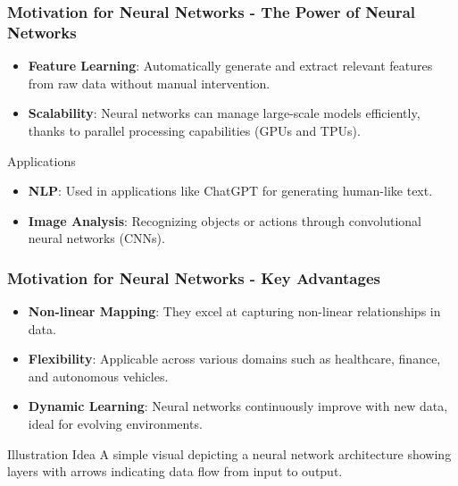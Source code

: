 \documentclass[aspectratio=169]{beamer}
\begin{document}
\begin{frame}[fragile]
    \frametitle{Motivation for Neural Networks - The Power of Neural Networks}
    \begin{itemize}
        \item \textbf{Feature Learning}: Automatically generate and extract relevant features from raw data without manual intervention.
        \item \textbf{Scalability}: Neural networks can manage large-scale models efficiently, thanks to parallel processing capabilities (GPUs and TPUs).
    \end{itemize}
    \begin{block}{Applications}
        \begin{itemize}
            \item \textbf{NLP}: Used in applications like ChatGPT for generating human-like text.
            \item \textbf{Image Analysis}: Recognizing objects or actions through convolutional neural networks (CNNs).
        \end{itemize}
    \end{block}
\end{frame}

\begin{frame}[fragile]
    \frametitle{Motivation for Neural Networks - Key Advantages}
    \begin{itemize}
        \item \textbf{Non-linear Mapping}: They excel at capturing non-linear relationships in data.
        \item \textbf{Flexibility}: Applicable across various domains such as healthcare, finance, and autonomous vehicles.
        \item \textbf{Dynamic Learning}: Neural networks continuously improve with new data, ideal for evolving environments.
    \end{itemize}
    \begin{block}{Illustration Idea}
        A simple visual depicting a neural network architecture showing layers with arrows indicating data flow from input to output.
    \end{block}
\end{frame}
\end{document}

